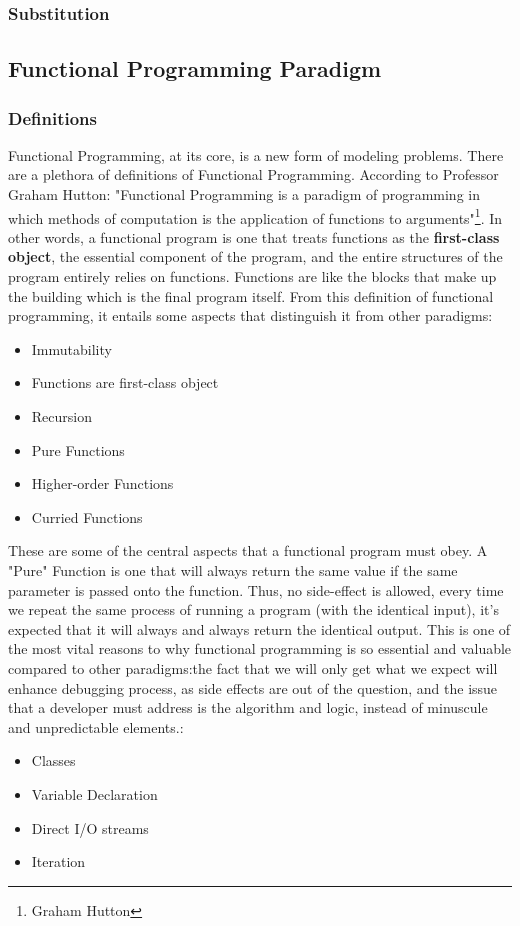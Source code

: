 \documentclass[twoside,final]{hcmut-report}
\begin{document}
\subsubsection{Substitution}

\subsection{Functional Programming Paradigm}
\subsubsection{Definitions}
\hspace*{3mm} Functional Programming, at its core, is a new form of modeling problems. There are a plethora of definitions of Functional Programming. According to Professor Graham Hutton: "Functional Programming is a paradigm of programming in which methods of computation is the application of functions to arguments"\footnote{Graham Hutton}. In other words, a functional program is one that treats functions as the \textbf{first-class object}, the essential component of the program, and the entire structures of the program entirely relies on functions. Functions are like the blocks that make up the building which is the final program itself. From this definition of functional programming, it entails some aspects that distinguish it from other paradigms:

\begin{itemize}

\item Immutability
\item Functions are first-class object
\item Recursion
\item Pure Functions
\item Higher-order Functions
\item Curried Functions
\end{itemize}

\hspace*{3mm} These are some of the central aspects that a functional program must obey. A "Pure" Function is one that will always return the same value if the same parameter is passed onto the function. Thus, no side-effect is allowed, every time we repeat the same process of running a program (with the identical input), it's expected that it will always and always return the identical output.  This is one of the most vital reasons to why functional programming is so essential and valuable compared to other paradigms:the fact that we will only get what we expect will enhance debugging process, as side effects are out of the question, and the issue that a developer must address is the algorithm and logic, instead of minuscule and unpredictable elements.:
\begin{itemize}
\item Classes
\item Variable Declaration
\item Direct I/O streams
\item Iteration
\end{itemize}
 
\end{document}
